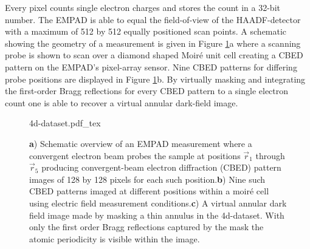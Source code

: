%
Every pixel counts single electron charges and stores the count in a 32-bit number. 
%
The EMPAD is able to equal the field-of-view of the HAADF-detector with a maximum of 512 by 512 equally positioned scan points. 
%
A schematic showing the geometry of a measurement is given in Figure \ref{fig:4d_dataset}a where a scanning probe is shown to scan over a diamond shaped Moiré unit cell creating a CBED pattern on the EMPAD's pixel-array sensor. 
%
Nine CBED patterns for differing probe positions are displayed in Figure \ref{fig:4d_dataset}b. By virtually masking and integrating the first-order Bragg reflections for every CBED pattern to a single electron count one is able to recover a virtual annular dark-field image. %

\begin{figure}[h]
	\centering
	\def\svgwidth{1\linewidth}
	{4d-dataset.pdf_tex}
	\caption{\textbf{a}) Schematic overview of an EMPAD measurement where a convergent electron beam probes the sample at positions $\vec{r}_1$ through $\vec{r}_5$ producing convergent-beam electron diffraction (CBED) pattern images of 128 by 128 pixels for each such position.\textbf{b}) Nine such CBED patterns imaged at different positions within a moiré cell using electric field measurement conditions.\textbf{c}) A virtual annular dark field image made by masking a thin annulus in the 4d-dataset. With only the first order Bragg reflections captured by the mask the atomic periodicity is visible within the image.}
	\label{fig:4d_dataset}
\end{figure}

